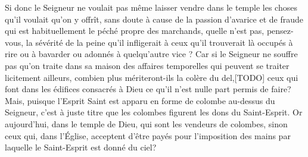 Si donc le Seigneur ne voulait pas même laisser vendre dans le temple
	les choses qu’il voulait qu’on y offrît,
	sans doute à cause de la passion d’avarice et de fraude
		qui est habituellement le péché propre des marchands,
	quelle n’est pas, pensez-vous, la sévérité de la peine qu’il infligerait
	à ceux qu’il trouverait là occupés à rire ou à bavarder
		ou adonnés à quelqu’autre vice ?
Car si le Seigneur ne souffre pas
		qu’on traite dans sa maison des affaires temporelles
	qui peuvent se traiter licitement ailleurs,
	combien plus mériteront-ils la colère du del,[TODO]
	ceux qui font dans les édifices consacrés à Dieu
		ce qu’il n’est nulle part permis de faire?
Mais, puisque l’Esprit Saint
		est apparu en forme de colombe au-dessus du Seigneur,
	c’est à juste titre que les colombes figurent les dons du Saint-Esprit.
Or aujourd’hui, dans le temple de Dieu, qui sont les vendeurs de colombes,
	sinon ceux qui, dans l’Église, acceptent d’être payés
	pour l’imposition des mains par laquelle le Saint-Esprit est donné du ciel?
